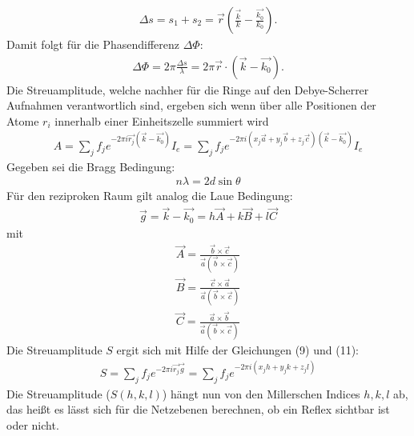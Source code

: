 \begin{align}
    \Delta s= s_1 + s_2= \vec{r} \left(\frac{\vec{k}}{k}-\frac{\vec{k_0}}{k_0} \right).
\end{align}
Damit folgt für die Phasendifferenz $\Delta \Phi$:
\begin{align}
     \Delta \Phi= 2\pi \frac{\Delta s}{\lambda}= 2 \pi \vec{r}\cdot(\vec{k}-\vec{k_0}).
\end{align}
Die Streuamplitude, welche nachher für die Ringe auf den Debye-Scherrer Aufnahmen
verantwortlich sind, ergeben sich wenn über alle Positionen der Atome $r_i$
innerhalb einer Einheitszelle summiert wird
\begin{align}
A=\sum_j f_j e^{-2 \pi i \vec{r_j} (\vec{k}-\vec{k_0})} I_e=\sum_j f_j e^{-2\pi i (x_j\vec{a}
+y_j \vec{b} + z_j \vec{c})(\vec{k}-\vec{k_0})} I_e
\end{align}
Gegeben sei die Bragg Bedingung:
\begin{align}
n\lambda = 2d \sin \theta
    \label{braggi}
\end{align}
Für den reziproken Raum gilt analog die Laue Bedingung:
\begin{align}
    \vec{g}= \vec{k}-\vec{k_0}= h \vec{A}+ k\vec{B}+l\vec{C}
\end{align}
mit
\begin{align*}
    \vec{A}= \frac{\vec{b} \times \vec{c}} { \vec{a} (\vec{b} \times \vec{c})}\\
    \vec{B}= \frac{\vec{c} \times \vec{a}} { \vec{a} (\vec{b} \times \vec{c})}\\
    \vec{C}= \frac{\vec{a} \times \vec{b}} { \vec{a} (\vec{b} \times \vec{c})}
\end{align*}
Die Streuamplitude $S$ ergit sich mit Hilfe der Gleichungen (9) und (11):
\begin{align}
    S=\sum_j f_j e^{-2 \pi i \vec{r_j} \vec{g}}=\sum_j f_j e^{-2 \pi i(x_j
    h + y_j k + z_j l)}
\label{streu}
\end{align}
Die Streuamplitude ($S(h,k,l)$) hängt nun von den Millerschen Indices $h,k,l$ ab,
das heißt es lässt sich für die Netzebenen berechnen, ob ein Reflex sichtbar ist oder nicht.
